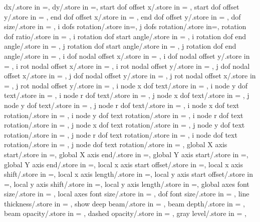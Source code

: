{dx/.store in =\deltaxdir,
dy/.store in =\deltaydir,
start dof offset x/.store in = \startoffsetx,
start dof offset y/.store in = \startoffsety,
end dof offset x/.store in = \endoffsetx,
end dof offset y/.store in = \endoffsety,
dof size/.store in = \lengthdofs,
i dofs rotation/.store in=\dofsroti,
j dofs rotation/.store in=\dofsrotj,
rotation dof ratio/.store in = \rotationdofratio,
i rotation dof start angle/.store in = \irotdofstartangle,
i rotation dof end angle/.store in = \irotdofendangle,
j rotation dof start angle/.store in = \jrotdofstartangle,
j rotation dof end angle/.store in = \jrotdofendangle, 
i dof nodal offset x/.store in = \idofnodaloffsetx,
i dof nodal offset y/.store in = \idofnodaloffsety,
i rot nodal offset x/.store in = \irotnodaloffsetx,
i rot nodal offset y/.store in = \irotnodaloffsety,
j dof nodal offset x/.store in = \jdofnodaloffsetx,
j dof nodal offset y/.store in = \jdofnodaloffsety,
j rot nodal offset x/.store in = \jrotnodaloffsetx,
j rot nodal offset y/.store in = \jrotnodaloffsety,
i node x dof text/.store in = \inodexdoftext,
i node y dof text/.store in = \inodeydoftext,
i node r dof text/.store in = \inoderdoftext,
j node x dof text/.store in = \jnodexdoftext,
j node y dof text/.store in = \jnodeydoftext,
j node r dof text/.store in = \jnoderdoftext,
i node x dof text rotation/.store in = \inodexdoftextrot,
i node y dof text rotation/.store in = \inodeydoftextrot,
i node r dof text rotation/.store in = \inoderdoftextrot,
j node x dof text rotation/.store in = \jnodexdoftextrot,
j node y dof text rotation/.store in = \jnodeydoftextrot,
j node r dof text rotation/.store in = \jnoderdoftextrot,
i node dof text rotation/.store in = \inodedoftextrot,
j node dof text rotation/.store in = \jnodedoftextrot,
global X axis start/.store in =\globalXstart,
global X axis end/.store in =\globalXend,
global Y axis start/.store in =\globalYstart,
global Y axis end/.store in =\globalYend,
local x axis start offset/.store in =\localxstartoffset,
local x axis shift/.store in =\localxshift,
local x axis length/.store in =\localxlength,
local y axis start offset/.store in =\localystartoffset,
local y axis shift/.store in =\localyshift,
local y axis length/.store in =\localylength,
global axes font size/.store in = \globalaxesfontsize,
local axes font size/.store in = \localaxesfontsize,
dof font size/.store in = \doffontsize,
line thickness/.store in = \linethickness,
show deep beam/.store in = \showdeep,
beam depth/.store in = \beamdepth,
beam opacity/.store in = \beamopa,
dashed opacity/.store in = \dashedopa,
gray level/.store in = \graylevel,
}
